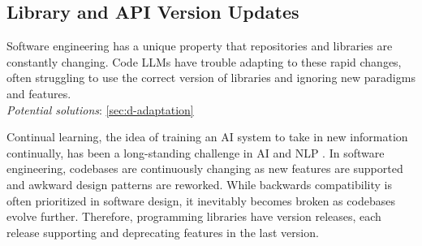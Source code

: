 

\subsection{Library and API Version Updates} \label{sec:c-library-updates}

\begin{tcolorbox}[colback=lightgreen, boxrule=0pt, arc=5pt, outer arc=5pt, after skip=10pt plus 2pt]
Software engineering has a unique property that repositories and libraries are constantly changing. Code LLMs have trouble adapting to these rapid changes, often struggling to use the correct version of libraries and ignoring new paradigms and features. 
\newline \\
\textit{Potential solutions}: \ref{sec:d-adaptation}
\end{tcolorbox}

Continual learning, the idea of training an AI system to take in new information continually, has been a long-standing challenge in AI and NLP  \citep{wu2024continual, wang2024comprehensive}. In software engineering, codebases are continuously changing as new features are supported and awkward design patterns are reworked. While backwards compatibility is often prioritized in software design, it inevitably becomes broken as codebases evolve further. Therefore, programming libraries have version releases, each release supporting and deprecating features in the last version. 


